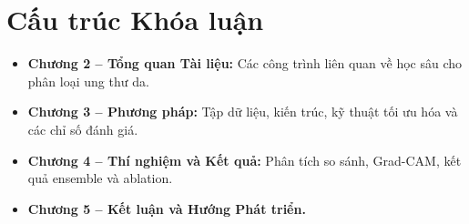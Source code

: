 \documentclass[11pt,a4paper]{report}
\begin{document}
\section{Cấu trúc Khóa luận}

\begin{itemize}
    \item \textbf{Chương 2 -- Tổng quan Tài liệu:} Các công trình liên quan về học sâu cho phân loại ung thư da.
    \item \textbf{Chương 3 -- Phương pháp:} Tập dữ liệu, kiến trúc, kỹ thuật tối ưu hóa và các chỉ số đánh giá.
    \item \textbf{Chương 4 -- Thí nghiệm và Kết quả:} Phân tích so sánh, Grad-CAM, kết quả ensemble và ablation.
    \item \textbf{Chương 5 -- Kết luận và Hướng Phát triển.}
\end{itemize}






\printbibliography[title={Tài liệu tham khảo}]
\end{document}

